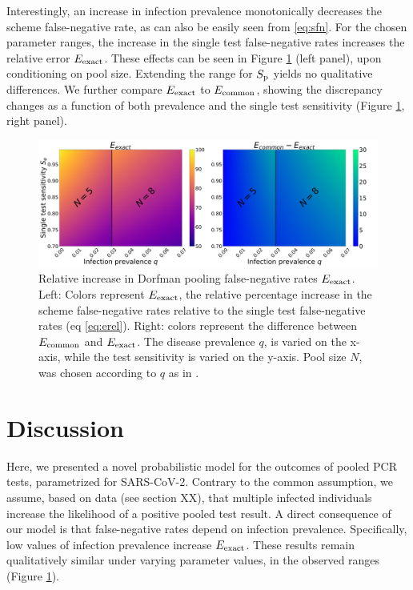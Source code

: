 \documentclass{article}
\begin{document}
Interestingly, an increase in infection prevalence monotonically
decreases the scheme false-negative rate, as can also be easily seen
from \eqref{eq:sfn}. For the chosen parameter ranges, the increase in
the single test false-negative rates increases the relative error
$E_{\text{{exact}}}$. These effects can be seen in Figure \ref{fig1} (left
panel), upon conditioning on pool size. Extending the range for $S_\text{p}$
yields no qualitative differences. We further compare $E_{\text{{exact}}}$ to
$E_{\text{{common}}}$, showing the discrepancy changes as a function of both
prevalence and the single test sensitivity (Figure \ref{fig1}, right
panel).
\begin{figure}[H]
  \centering
  \includegraphics[width=\textwidth]{heatmap_sfn.jpg}
  \caption{Relative increase in Dorfman pooling false-negative rates
    $E_{\text{{exact}}}$. Left: Colors represent $E_{\text{{exact}}}$, the relative
    percentage increase in the scheme false-negative rates relative
    to the single test false-negative rates (eq
    \eqref{eq:erel}). Right: colors represent the difference between
    $E_{\text{{common}}}$ and $E_{\text{{exact}}}$. The disease prevalence $q$, is
    varied on the x-axis, while the test sensitivity is varied on
    the y-axis. Pool size $N$, was chosen according to $q$ as in
    \cite{DorfmanYuvalDor}.}\label{fig1}
\end{figure}

\section*{Discussion}
Here, we presented a novel probabilistic model for the outcomes of
pooled PCR tests, parametrized for SARS-CoV-2. Contrary to the common
assumption, we assume, based on data (see section XX), that multiple
infected individuals increase the likelihood of a positive pooled test
result. A direct consequence of our model is that false-negative rates
depend on infection prevalence. Specifically, low values of infection
prevalence increase $E_{\text{{exact}}}$. These results remain qualitatively
similar under varying parameter values, in the observed ranges
\cite{KitComparison,EstimatingRatesKucrika, EstimatingRatesLourenco,
  InterpretingCOVID19Test} (Figure \ref{fig1}).
\end{document}
